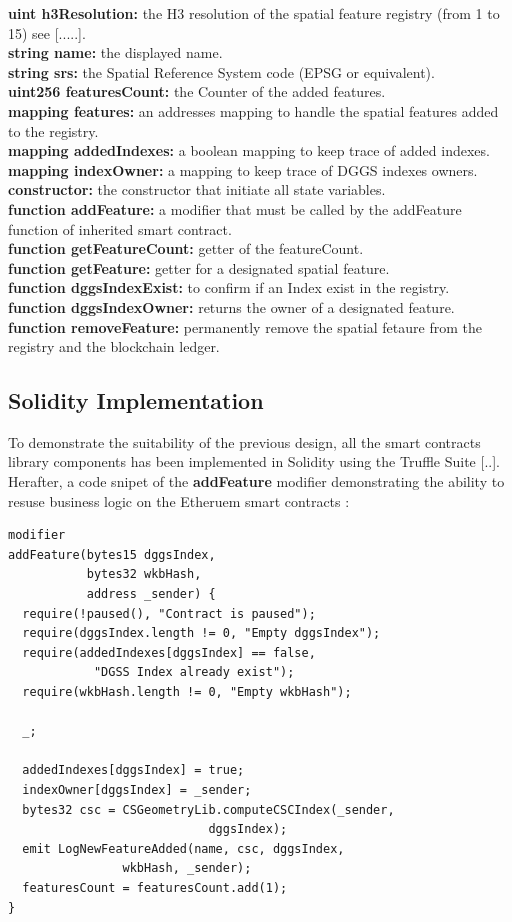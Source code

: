 \documentclass{isprs} %
\begin{document}
\textbf{uint h3Resolution:} the H3 resolution of the spatial feature registry (from 1 to 15) see [.....]. \\ 
\textbf{string name:} the displayed name. \\
\textbf{string srs:} the Spatial Reference System code (EPSG or equivalent). \\
\textbf{uint256 featuresCount:} the Counter of the added features. \\
\textbf{mapping features:} an addresses mapping to handle the spatial features added to the registry. \\
\textbf{mapping addedIndexes:} a boolean mapping to keep trace of added indexes. \\
\textbf{mapping indexOwner:} a mapping to keep trace of DGGS indexes owners. \\
\textbf{constructor:} the constructor that initiate all state variables. \\
\textbf{function addFeature:} a modifier that must be called by the addFeature function of inherited smart contract. \\
\textbf{function getFeatureCount:} getter of the featureCount. \\
\textbf{function getFeature:} getter for a designated spatial feature. \\
\textbf{function dggsIndexExist:} to confirm if an Index exist in the registry. \\
\textbf{function dggsIndexOwner:} returns the owner of a designated feature. \\
\textbf{function removeFeature:} permanently remove the spatial fetaure from the registry and the blockchain ledger.

\subsection{Solidity Implementation}\label{sec:Solidity Implementation}

To demonstrate the suitability of the previous design, all the smart contracts library components has been implemented in Solidity using the Truffle Suite [..]. Herafter, a code snipet of the \textbf{addFeature} modifier demonstrating the ability to resuse business logic on the Etheruem smart contracts :

\begin{verbatim}
modifier 
addFeature(bytes15 dggsIndex, 
		   bytes32 wkbHash, 
		   address _sender) {
  require(!paused(), "Contract is paused");
  require(dggsIndex.length != 0, "Empty dggsIndex");
  require(addedIndexes[dggsIndex] == false, 
  			"DGSS Index already exist");
  require(wkbHash.length != 0, "Empty wkbHash");

  _;

  addedIndexes[dggsIndex] = true;
  indexOwner[dggsIndex] = _sender;
  bytes32 csc = CSGeometryLib.computeCSCIndex(_sender, 
  							dggsIndex); 
  emit LogNewFeatureAdded(name, csc, dggsIndex, 
  				wkbHash, _sender);
  featuresCount = featuresCount.add(1);
}
\end{verbatim}
\end{document}
